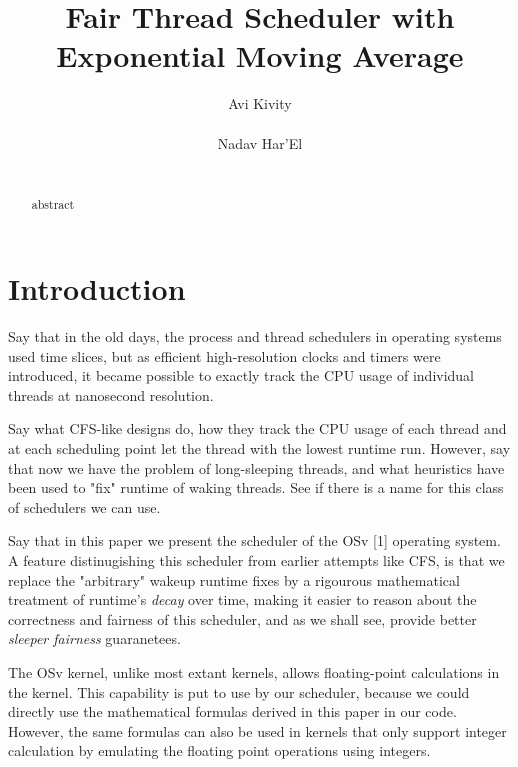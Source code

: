 \documentclass{sig-alternate}
\begin{document}
\title{Fair Thread Scheduler with Exponential Moving Average}
\author{
\alignauthor
Avi Kivity\\
   \\
\alignauthor
Nadav Har'El\\
   \\
}
\maketitle
\begin{abstract}
abstract
\end{abstract}


\section{Introduction}
Say that in the old days, the process and thread schedulers in operating
systems used time slices, but as efficient high-resolution clocks and
timers were introduced, it became possible to exactly track the CPU usage
of individual threads at nanosecond resolution.

Say what CFS-like designs do, how they track the CPU usage of each thread
and at each scheduling point let the thread with the lowest runtime run.
However, say that now we have the problem of long-sleeping threads, and
what heuristics have been used to "fix" runtime of waking threads.
See if there is a name for this class of schedulers we can use.

Say that in this paper we present the scheduler of the OSv [1] operating
system. A feature distinugishing this scheduler from earlier attempts like
CFS, is that we replace the "arbitrary" wakeup runtime fixes by a
rigourous mathematical treatment of runtime's \emph{decay} over time,
making it easier to reason about the correctness and fairness of this
scheduler, and as we shall see, provide better \emph{sleeper fairness}
guaranetees.

The OSv kernel, unlike most extant kernels, allows floating-point
calculations in the kernel. This capability is put to use by our
scheduler, because we could directly use the mathematical formulas
derived in this paper in our code. However, the same formulas can
also be used in kernels that only support integer calculation by
emulating the floating point operations using integers.
\end{document}
